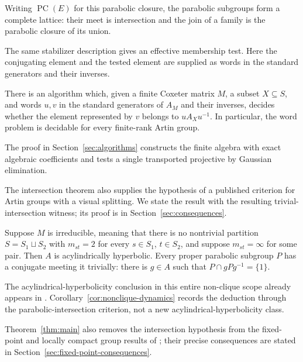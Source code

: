 Writing $\operatorname{PC}(E)$ for this parabolic closure, the parabolic
subgroups form a complete lattice: their meet is intersection and the
join of a family is the parabolic closure of its union.

The same stabilizer description gives an effective membership test.
Here the conjugating element and the tested element are supplied as
words in the standard generators and their inverses.

\begin{corollary}
\label{cor:membership}
There is an algorithm which, given a finite Coxeter matrix $M$, a subset
$X\subseteq S$, and words $u,v$ in the standard generators of $A_M$ and their inverses, decides
whether the element represented by $v$ belongs to $uA_Xu^{-1}$.
In particular, the word problem is decidable for every finite-rank
Artin group.
\end{corollary}

The proof in Section~\ref{sec:algorithms} constructs the finite algebra
with exact algebraic coefficients and tests a single transported
projective by Gaussian elimination.

The intersection theorem also supplies the hypothesis of a published
criterion for Artin groups with a visual splitting.  We state the
result with the resulting trivial-intersection witness; its proof is
in Section~\ref{sec:consequences}.

\begin{corollary}
\label{cor:nonclique-dynamics}
Suppose $M$ is irreducible, meaning that there is no nontrivial partition
$S=S_1\sqcup S_2$ with $m_{st}=2$ for every $s\in S_1$, $t\in S_2$, and
suppose $m_{st}=\infty$ for some pair. Then $A$ is acylindrically hyperbolic.
Every proper parabolic subgroup $P$ has a conjugate meeting it trivially:
there is $g\in A$ such that $P\cap gPg^{-1}=\{1\}$.
\end{corollary}


The acylindrical-hyperbolicity conclusion in this entire non-clique scope
already appears in \cite[Theorem~1.2]{KatoOguni2025}. Corollary~\ref{cor:nonclique-dynamics}
records the deduction through the parabolic-intersection criterion, not a
new acylindrical-hyperbolicity class.

Theorem~\ref{thm:main} also removes the intersection hypothesis from
the fixed-point and locally compact group results of
\cite{MoellerParisVarghese2024}; their precise consequences are stated
in Section~\ref{sec:fixed-point-consequences}.

